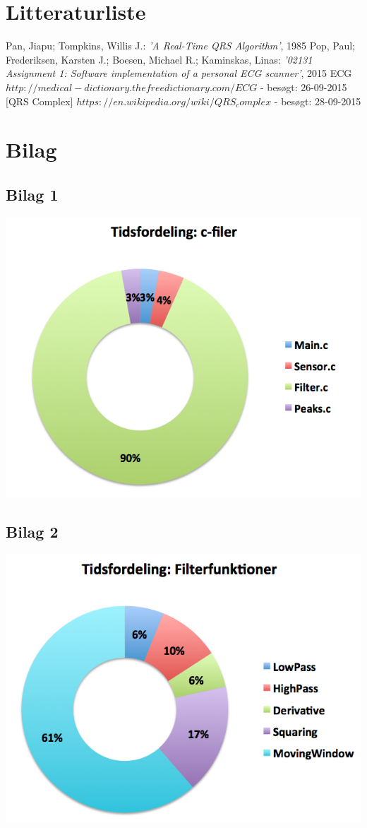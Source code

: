 \documentclass{article}
\begin{document}
\section{Litteraturliste}
\begin{thebibliography}{}
Pan, Jiapu; Tompkins, Willis J.: \textit{'A Real-Time QRS Algorithm'}, 1985
Pop, Paul; Frederiksen, Karsten J.; Boesen, Michael R.; Kaminskas, Linas: \textit{'02131 Assignment 1: Software implementation of a personal ECG scanner'}, 2015
ECG $http://medical-dictionary.thefreedictionary.com/ECG$ - besøgt: 26-09-2015
[QRS Complex] $https://en.wikipedia.org/wiki/QRS_complex$ - besøgt: 28-09-2015
\end{thebibliography}

\newpage
\section{Bilag}
\subsection*{Bilag 1}
\includegraphics[scale=0.47]{c-filer.png}
\subsection*{Bilag 2}
\includegraphics[scale=0.49]{filter-funktioner.png}
\end{document}
